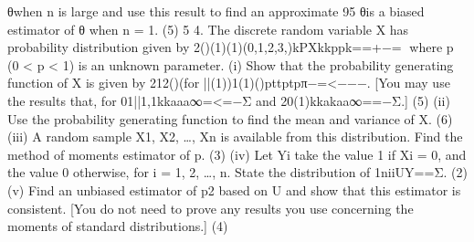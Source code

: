 θwhen n is large and use this result to find an approximate 95%
θis a biased estimator of θ when n = 1. (5)
5
4. The discrete random variable X has probability distribution given by 2()(1)(1)(0,1,2,3,)kPXkkppk==+−= where p (0 < p < 1) is an unknown parameter. (i) Show that the probability generating function of X is given by 212()(for ||(1))1(1)()pttptpπ−=<−−−. [You may use the results that, for 01||1,1kkaaa∞=<=−Σ and 20(1)kkakaa∞==−Σ.] (5) (ii) Use the probability generating function to find the mean and variance of X. (6) (iii) A random sample X1, X2, …, Xn is available from this distribution. Find the method of moments estimator of p. (3) (iv) Let Yi take the value 1 if Xi = 0, and the value 0 otherwise, for i = 1, 2, …, n. State the distribution of 1niiUY==Σ. (2) (v) Find an unbiased estimator of p2 based on U and show that this estimator is consistent. [You do not need to prove any results you use concerning the moments of standard distributions.] (4)
